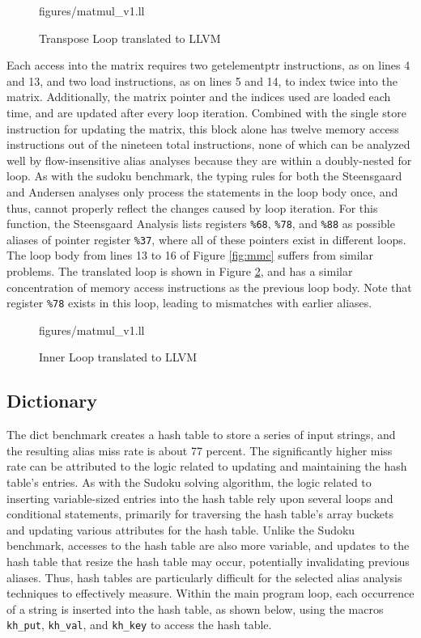 \begin{figure} [h]
   {figures/matmul_v1.ll}
  \caption{Transpose Loop translated to LLVM}
  \label{fig:mmll}
\end{figure}

Each access into the matrix requires two getelementptr instructions, as on lines 4 and 13, and two load instructions, as on lines 5 and 14, to index twice into the matrix. Additionally, the matrix pointer and the indices used are loaded each time, and are updated after every loop iteration. Combined with the single store instruction for updating the matrix, this block alone has twelve memory access instructions out of the nineteen total instructions, none of which can be analyzed well by flow-insensitive alias analyses because they are within a doubly-nested for loop. As with the sudoku benchmark, the typing rules for both the Steensgaard and Andersen analyses only process the statements in the loop body once, and thus, cannot properly reflect the changes caused by loop iteration. For this function, the Steensgaard Analysis lists registers \texttt{\%68}, \texttt{\%78}, and \texttt{\%88} as possible aliases of pointer register \texttt{\%37}, where all of these pointers exist in different loops. The loop body from lines 13 to 16 of Figure \ref{fig:mmc} suffers from similar problems. The translated loop is shown in Figure \ref{fig:mmll2}, and has a similar concentration of memory access instructions as the previous loop body. Note that register \texttt{\%78} exists in this loop, leading to mismatches with earlier aliases.

\begin{figure} [h]
   {figures/matmul_v1.ll}
  \caption{Inner Loop translated to LLVM}
  \label{fig:mmll2}
\end{figure}

\subsection{Dictionary}
The dict benchmark creates a hash table to store a series of input strings, and the resulting alias miss rate is about 77 percent. The significantly higher miss rate can be attributed to the logic related to updating and maintaining the hash table's entries. As with the Sudoku solving algorithm, the logic related to inserting variable-sized entries into the hash table rely upon several loops and conditional statements, primarily for traversing the hash table's array buckets and updating various attributes for the hash table. Unlike the Sudoku benchmark, accesses to the hash table are also more variable, and updates to the hash table that resize the hash table may occur, potentially invalidating previous aliases. Thus, hash tables are particularly difficult for the selected alias analysis techniques to effectively measure. Within the main program loop, each occurrence of a string is inserted into the hash table, as shown below, using the macros \texttt{kh\_put}, \texttt{kh\_val}, and \texttt{kh\_key} to access the hash table.

